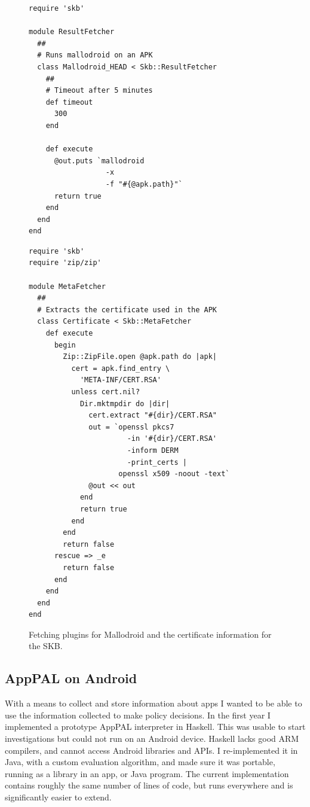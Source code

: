 \documentclass[a4paper]{scrartcl}
\begin{document}
\begin{figure}\centering
  \lstset{language=ruby,
          basicstyle  =\scriptsize\ttfamily,
          keywordstyle=\scriptsize\bfseries\ttfamily,
          stringstyle =\scriptsize\sffamily,
          commentstyle=\scriptsize\slshape\ttfamily}
  \begin{minipage}{0.48\linewidth}
    \begin{lstlisting}
require 'skb'

module ResultFetcher
  ##
  # Runs mallodroid on an APK
  class Mallodroid_HEAD < Skb::ResultFetcher
    ##
    # Timeout after 5 minutes
    def timeout
      300
    end

    def execute
      @out.puts `mallodroid
                  -x
                  -f "#{@apk.path}"`
      return true
    end
  end
end
    \end{lstlisting}
  \end{minipage}
  \begin{minipage}{0.48\linewidth}
    \begin{lstlisting}
require 'skb'
require 'zip/zip'

module MetaFetcher
  ##
  # Extracts the certificate used in the APK
  class Certificate < Skb::MetaFetcher
    def execute
      begin
        Zip::ZipFile.open @apk.path do |apk|
          cert = apk.find_entry \
            'META-INF/CERT.RSA'
          unless cert.nil?
            Dir.mktmpdir do |dir|
              cert.extract "#{dir}/CERT.RSA"
              out = `openssl pkcs7
                       -in '#{dir}/CERT.RSA'
                       -inform DERM
                       -print_certs |
                     openssl x509 -noout -text`
              @out << out
            end
            return true
          end
        end
        return false
      rescue => _e
        return false
      end
    end
  end
end
    \end{lstlisting}
  \end{minipage}
  \caption{Fetching plugins for Mallodroid and the certificate information for the \ac{SKB}.}
  \label{fig:fetcher}
\end{figure}

\subsection{AppPAL on Android}

With a means to collect and store information about apps I wanted to be able to use the information collected to make policy decisions.
In the first year I implemented a prototype AppPAL interpreter in Haskell.
This was usable to start investigations but could not run on an Android device.
Haskell lacks good ARM compilers, and cannot access Android libraries and APIs.
I re-implemented it in Java, with a custom evaluation algorithm, and made sure it was portable, running as a library in an app, or Java program.
The current implementation contains roughly the same number of lines of code, but runs everywhere and is significantly easier to extend.
\end{document}
